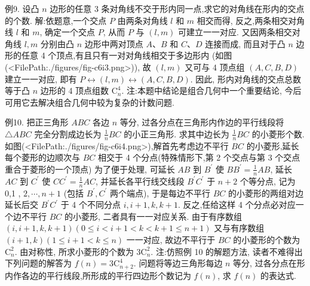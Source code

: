 例9. 设凸 $n$ 边形的任意 3 条对角线不交于形内同一点,求它的对角线在形内的交点的个数.
解:依题意,一个交点 $P$ 由两条对角线 $l$ 和 $m$ 相交而得, 反之,两条相交对角线 $l$ 和 $m$, 确定一个交点 $P$, 从而 $P$ 与 $(l, m)$ 可建立一一对应.
又因两条相交对角线 $l, m$ 分别由凸 $n$ 边形中两对顶点 $A 、 B$ 和 $C 、 D$ 连接而成, 而且对于凸 $n$ 边形的任意 4 个顶点,有且只有一对对角线相交于多边形内 (如图(<FilePath:./figures/fig-c6i3.png>)), 故 $(l, m)$ 又可与 4 顶点组 $(A, C, B, D)$ 建立一一对应, 即有 $P \leftrightarrow(l, m) \leftrightarrow(A, C, B, D)$. 因此, 形内对角线的交点总数等于凸 $n$ 边形的 4 顶点组数 $\mathrm{C}_n^4$.
注:本题中结论是组合几何中一个重要结论, 今后可用它去解决组合几何中较为复杂的计数问题.



例10. 把正三角形 $A B C$ 各边 $n$ 等分, 过各分点在三角形内作边的平行线段将 $\triangle A B C$ 完全分割成边长为 $\frac{1}{n} B C$ 的小正三角形.
求其中边长为 $\frac{1}{n} B C$ 的小菱形个数.
如图(<FilePath:./figures/fig-c6i4.png>),解首先考虑边不平行 $B C$ 的小菱形,延长每个菱形的边顺次与 $B C$ 相交于 4 个分点(特殊情形下,第 2 个交点与第 3 个交点重合于菱形的一个顶点) 为了便于处理, 可延长 $A B$ 到 $B^{\prime}$ 使 $B B^{\prime}= \frac{1}{n} A B$, 延长 $A C$ 到 $C^{\prime}$ 使 $C C^{\prime}=\frac{1}{n} A C$, 并延长各平行线交线段 $B^{\prime} C^{\prime}$ 于 $n+2$ 个等分点, 记为 0,1 , $2, \cdots, n+1$ (包括 $B^{\prime}, C^{\prime}$ 两个端点), 于是每边不平行 $B C$ 的小菱形的两组对边延长后交 $B^{\prime} C^{\prime}$ 于 4 个不同分点 $i, i+1, k, k+1$. 反之,任给这样 4 个分点必对应一个边不平行 $B C$ 的小菱形, 二者具有一一对应关系.
由于有序数组 $(i, i+1, k, k+1)(0 \leqslant i<i+1<k<k+1 \leqslant n+1)$ 又与有序数组 $(i+1, k)(1 \leqslant i+1<k \leqslant n)$ 一一对应, 故边不平行于 $B C$ 的小菱形的个数为 $\mathrm{C}_n^2$. 由对称性, 所求小菱形的个数为 $3 \mathrm{C}_n^2$.
注:仿照例 10 的解题方法, 读者不难得出下列问题的解答为 $f(n)= 3 \mathrm{C}_{n+2}^4$.
问题将等边三角形每边 $n$ 等分, 过各分点在形内作各边的平行线段,所形成的平行四边形个数记为 $f(n)$, 求 $f(n)$ 的表达式.



